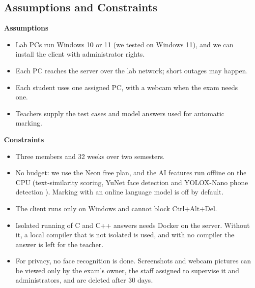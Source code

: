 \subsection{Assumptions and Constraints}
\label{sec:constraints}

\textbf{Assumptions}
\begin{itemize}[nosep]
    \item Lab PCs run Windows 10 or 11 (we tested on Windows 11), and we can install the client with administrator rights.
    \item Each PC reaches the server over the lab network; short outages may happen.
    \item Each student uses one assigned PC, with a webcam when the exam needs one.
    \item Teachers supply the test cases and model answers used for automatic marking.
\end{itemize}

\textbf{Constraints}
\begin{itemize}[nosep]
    \item Three members and 32 weeks over two semesters.
    \item No budget: we use the Neon free plan, and the AI features run offline on the CPU (text-similarity scoring, YuNet face detection \cite{yunet} and YOLOX-Nano phone detection \cite{yolox}). Marking with an online language model is off by default.
    \item The client runs only on Windows and cannot block Ctrl+Alt+Del.
    \item Isolated running of C and C++ answers needs Docker on the server. Without it, a local compiler that is not isolated is used, and with no compiler the answer is left for the teacher.
    \item For privacy, no face recognition is done. Screenshots and webcam pictures can be viewed only by the exam's owner, the staff assigned to supervise it and administrators, and are deleted after 30 days.
\end{itemize}
